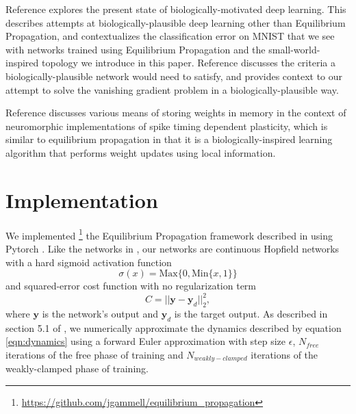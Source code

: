 \documentclass[utf8]{frontiersSCNS}
\newcommand{\mtx}[1]{\mathbf{#1}}
\begin{document}
Reference \citep{bartunov2018} explores the present state of biologically-motivated deep learning. This describes attempts at biologically-plausible deep learning other than Equilibrium Propagation, and contextualizes the classification error on MNIST that we see with networks trained using Equilibrium Propagation and the small-world-inspired topology we introduce in this paper. Reference \citep{bengio2015} discusses the criteria a biologically-plausible network would need to satisfy, and provides context to our attempt to solve the vanishing gradient problem in a biologically-plausible way.


Reference \citep{pedroni2019} discusses various means of storing weights in memory in the context of neuromorphic implementations of spike timing dependent plasticity, which is similar to equilibrium propagation in that it is a biologically-inspired learning algorithm that performs weight updates using local information.

\section{Implementation}
\label{sec:implementation}

We implemented \footnote{\url{https://github.com/jgammell/equilibrium_propagation}} the Equilibrium Propagation framework described in \citep{scellier17} using Pytorch \citep{pytorch2019}. Like the networks in \citep{scellier17}, our networks are continuous Hopfield networks with a hard sigmoid activation function $$\sigma(x)=\text{Max}\{0, \text{Min}\{x, 1\}\}$$ and squared-error cost function with no regularization term $$C=||\mtx{y}-\mtx{y}_d||_2^2,$$ where $\mtx{y}$ is the network's output and $\mtx{y}_d$ is the target output. As described in section 5.1 of \citep{scellier17}, we numerically approximate the dynamics described by equation \ref{eqn:dynamics} using a forward Euler approximation with step size $\epsilon$, $N_{free}$ iterations of the free phase of training and $N_{weakly-clamped}$ iterations of the weakly-clamped phase of training.
\end{document}
